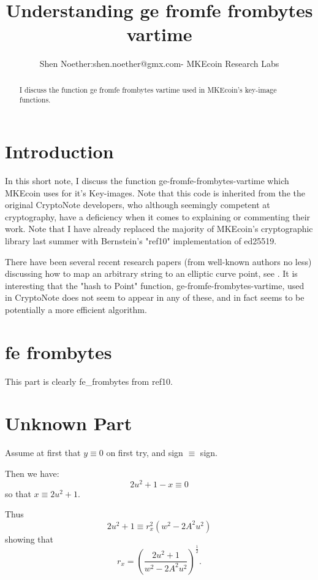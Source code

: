 \documentclass[12pt,oneside,english]{amsart}
\numberwithin{equation}{section}
\numberwithin{figure}{section}
\theoremstyle{plain}
\theoremstyle{plain}
\theoremstyle{remark}
\theoremstyle{plain}
\theoremstyle{remark}
\theoremstyle{remark}
\theoremstyle{plain}
\theoremstyle{definition}
\begin{document}
\lstset{language=C} 


\title{Understanding ge fromfe frombytes vartime}


\author{Shen Noether:shen.noether@gmx.com- MKEcoin Research Labs}
\begin{abstract}
I discuss the function ge fromfe frombytes vartime used in MKEcoin's key-image functions. 
\end{abstract}

\maketitle

\tableofcontents
\section{Introduction}
In this short note, I discuss the function ge-fromfe-frombytes-vartime which MKEcoin uses for it's Key-images. Note that this code is inherited from the the original CryptoNote developers, who although seemingly competent at cryptography, have a deficiency when it comes to explaining or commenting their work. Note that I have already replaced the majority of MKEcoin's cryptographic library last summer with Bernstein's "ref10" implementation of ed25519.
\par
There have been several recent research papers (from well-known authors no less) discussing how to map an arbitrary string to an elliptic curve point, see \cite{Tib2010,Tib2013}. It is interesting that the "hash to Point" function, ge-fromfe-frombytes-vartime, used in CryptoNote \cite{CN} does not seem to appear in any of these, and in fact seems to be potentially a more efficient algorithm. 
\section{fe frombytes}
This part is clearly fe\_frombytes from ref10. 
\section{Unknown Part}
Assume at first that $y\equiv 0$ on first try, and sign $\equiv $ sign. 

\par

Then we have: 
\[
2u^2 + 1 - x \equiv 0
\]
so that $x\equiv 2u^2 + 1$. 

Thus 
\[
2u^2 + 1 \equiv r_x^2 (w^2 - 2A^2 u^2)
\]
showing that 
\[
r_x = \left(\frac{2u^2 + 1}{w^2 - 2A^2 u^2}\right)^{\frac{1}{2}}.
\]
\end{document}
